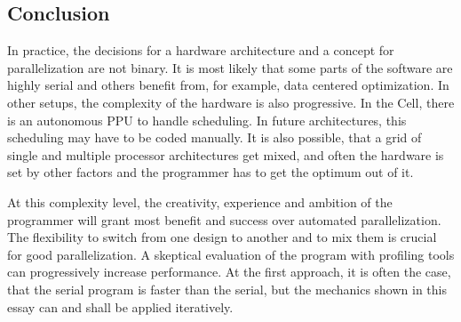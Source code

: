 \subsection{Conclusion}
\label{subsec:conclusion}
In practice, the decisions for a hardware architecture and a concept for parallelization are not binary. It is most likely that some parts of the software are highly serial and others benefit from, for example, data centered optimization. In other setups, the complexity of the hardware is also progressive. In the Cell, there is an autonomous PPU to handle scheduling. In future architectures, this scheduling may have to be coded manually. It is also possible, that a grid of single and multiple processor architectures get mixed, and often the hardware is set by other factors and the programmer has to get the optimum out of it.

At this complexity level, the creativity, experience and ambition  of the programmer will grant most benefit and success over automated parallelization. The flexibility to switch from one design to another and to mix them is crucial for good parallelization. A skeptical evaluation of the program with profiling tools can progressively increase performance. At the first approach, it is often the case, that the serial program is faster than the serial, but the mechanics shown in this essay can and shall be applied iteratively.




